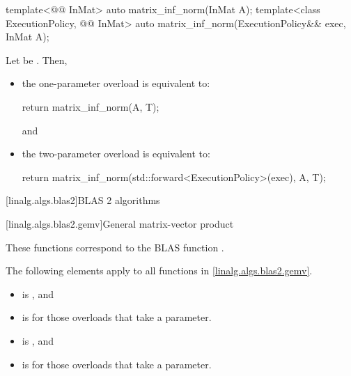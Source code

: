 %
\begin{itemdecl}
template<@@ InMat>
  auto matrix_inf_norm(InMat A);
template<class ExecutionPolicy, @@ InMat>
  auto matrix_inf_norm(ExecutionPolicy&& exec, InMat A);
\end{itemdecl}

\begin{itemdescr}

\pnum
\effects
Let  be
.
Then,
\begin{itemize}
\item
the one-parameter overload is equivalent to:
\begin{codeblock}
return matrix_inf_norm(A, T{});
\end{codeblock}
and
\item
the two-parameter overload is equivalent to:
\begin{codeblock}
return matrix_inf_norm(std::forward<ExecutionPolicy>(exec), A, T{});
\end{codeblock}
\end{itemize}
\end{itemdescr}

[linalg.algs.blas2]{BLAS 2 algorithms}

[linalg.algs.blas2.gemv]{General matrix-vector product}

\pnum
\begin{note}
These functions correspond to the BLAS function .
\end{note}

\pnum
The following elements apply to all functions in \ref{linalg.algs.blas2.gemv}.

\pnum
\mandates
\begin{itemize}
\item
{}
is , and
\item
{}
is  for those overloads that take a  parameter.
\end{itemize}

\pnum
\expects
\begin{itemize}
\item
{} is , and
\item
{} is  for those overloads that take a  parameter.
\end{itemize}

